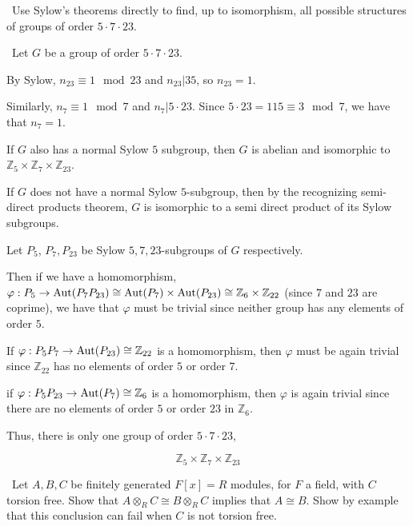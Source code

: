 \documentclass[12pt]{Qual}
\begin{document}
\begin{problem} $\,$
Use Sylow's theorems directly to find, up to isomorphism, all possible structures of groups of order $5\cdot7\cdot 23$.
\end{problem}


\begin{solution}$\,$
Let $G$ be a group of order $5\cdot 7\cdot 23.$

By Sylow, $n_{23}\equiv 1\mod 23$ and $n_{23}|35$, so $n_{23}=1$.

Similarly, $n_7\equiv 1\mod 7$ and $n_7|5\cdot23$. Since $5\cdot23=115\equiv 3\mod 7$, we have that $n_7=1$.

 If $G$ also has a normal Sylow $5$ subgroup, then $G$ is abelian and isomorphic to $\mathbb{Z}_5\times\mathbb{Z}_7\times\mathbb{Z}_{23}$.

If $G$ does not have a normal Sylow $5$-subgroup, then by the recognizing semi-direct products theorem, $G$ is isomorphic to a semi direct product of its Sylow subgroups.

 Let $P_5$, $P_7, P_{23}$ be Sylow $5,7,23$-subgroups of $G$ respectively.

Then if we have a homomorphism, $\varphi:P_5\to\text{Aut}(P_7P_{23})\cong\text{Aut}(P_7)\times\text{Aut}(P_{23})\cong\mathbb{Z}_6\times\mathbb{Z}_{22}$ (since $7$ and $23$ are coprime), we have that $\varphi$ must be trivial since neither group has any elements of order $5$.

 If $\varphi:P_5P_7\to\text{Aut}(P_{23})\cong\mathbb{Z}_{22}$ is a homomorphism, then $\varphi$ must be again trivial since $\mathbb{Z}_{22}$ has no elements of order $5$ or order $7.$

 if $\varphi:P_5P_{23}\to\text{Aut}(P_7)\cong\mathbb{Z}_6$ is a homomorphism, then $\varphi$ is again trivial since there are no elements of order $5$ or order $23$ in $\mathbb{Z}_6$.

Thus, there is only one group of order $5\cdot7\cdot23$, \begin{center}
    \begin{framed}
    $$\mathbb{Z}_5\times\mathbb{Z}_7\times\mathbb{Z}_{23}$$
    \end{framed}
\end{center}


\end{solution}
\newpage


\begin{problem} $\,$
Let $A,B,C$ be finitely generated $F[x]=R$ modules, for $F$ a field, with $C$ torsion free. Show that $A\otimes_RC\cong B\otimes_RC$ implies that $A\cong B$. Show by example that this conclusion can fail when $C$ is not torsion free.
\end{problem}
\end{document}
